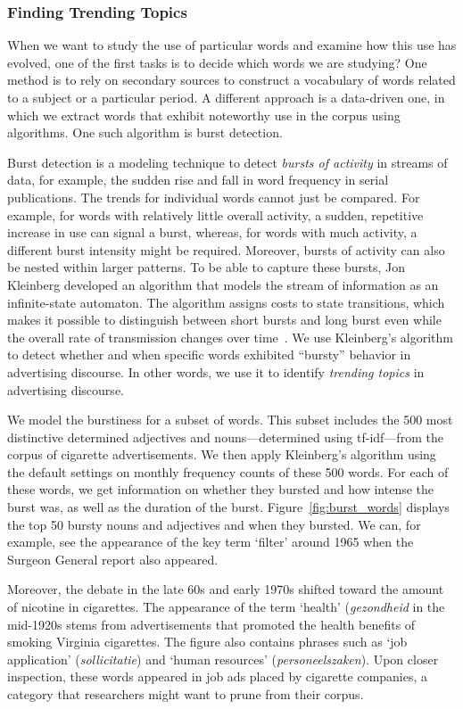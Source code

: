 \documentclass[USenglish]{article}
\begin{document}
\subsubsection{Finding Trending Topics}
When we want to study the use of particular words and examine how this use has evolved, one of the first tasks is to decide which words we are studying? One method is to rely on secondary sources to construct a vocabulary of words related to a subject or a particular period. A different approach is a data-driven one, in which we extract words that exhibit noteworthy use in the corpus using algorithms. One such algorithm is burst detection.

Burst detection is a modeling technique to detect \textit{bursts of activity} in streams of data, for example, the sudden rise and fall in word frequency in serial publications. The trends for individual words cannot just be compared. For example, for words with relatively little overall activity, a sudden, repetitive increase in use can signal a burst, whereas, for words with much activity, a different burst intensity might be required. Moreover, bursts of activity can also be nested within larger patterns. To be able to capture these bursts, Jon Kleinberg developed an algorithm that models the stream of information as an infinite-state automaton. The algorithm assigns costs to state transitions, which makes it possible to distinguish between short bursts and long burst even while the overall rate of transmission changes over time~\cite{kleinberg_bursty_2002}. We use Kleinberg's algorithm to detect whether and when specific words exhibited ``bursty'' behavior in advertising discourse. In other words, we use it to identify \textit{trending topics} in advertising discourse. 

We model the burstiness for a subset of words. This subset includes the 500 most distinctive determined adjectives and nouns---determined using tf-idf---from the corpus of cigarette advertisements. We then apply Kleinberg's algorithm using the default settings on monthly frequency counts of these 500 words. For each of these words, we get information on whether they bursted and how intense the burst was, as well as the duration of the burst. Figure~\ref{fig:burst_words} displays the top 50 bursty nouns and adjectives and when they bursted. We can, for example, see the appearance of the key term `filter' around 1965 when the Surgeon General report also appeared. 

Moreover, the debate in the late 60s and early 1970s shifted toward the amount of nicotine in cigarettes. The appearance of the term `health' (\textit{gezondheid} in the mid-1920s stems from advertisements that promoted the health benefits of smoking Virginia cigarettes. The figure also contains phrases such as `job application' (\textit{sollicitatie}) and `human resources' (\textit{personeelszaken}). Upon closer inspection, these words appeared in job ads placed by cigarette companies, a category that researchers might want to prune from their corpus.
\end{document}
